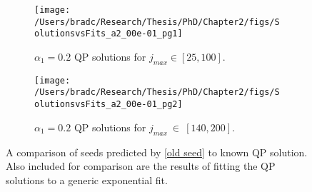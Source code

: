 \documentclass[../PhD.tex]{subfiles}
\begin{document}
\begin{subappendices}
\begin{figure}[ht]
\centering
	\begin{subfigure}[t]{0.45\textwidth}
		\texttt{[image: /Users/bradc/Research/Thesis/PhD/Chapter2/figs/SolutionsvsFits\_a2\_00e-01\_pg1]}
		\caption{$\alpha_1 = 0.2$ QP solutions for $j_{max} \in [25,100]$.}
		\label{fig: sol vs fit low jmax}
	\end{subfigure}
	\quad
	\begin{subfigure}[t]{0.45\textwidth}
		\texttt{[image: /Users/bradc/Research/Thesis/PhD/Chapter2/figs/SolutionsvsFits\_a2\_00e-01\_pg2]}
		\caption{$\alpha_1 = 0.2$ QP solutions for $j_{max}~\in~[140,200]$.}
		\label{fig: sol vs fit high jmax}
	\end{subfigure}
	\caption[Comparison of seed values to known QP solutions and exponential fitting]{A comparison of seeds predicted by \eqref{old seed} to known QP solution. Also included for comparison are the results of fitting the QP solutions to a generic exponential fit.}
	\label{fig: solutionfitting}
\end{figure}
			





\end{subappendices}
\end{document}
